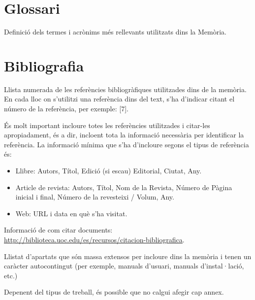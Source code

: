 \documentclass[CAT]{TFUOC}%
\begin{document}


\chapter{Glossari}

Definició dels termes i acrònims més rellevants utilitzats dins la Memòria.


\chapter{Bibliografia}

Llista numerada de les referències bibliogràfiques utilitzades dins de la memòria. En cada lloc on s'utilitzi una referència dins del text, s'ha d'indicar citant el número de la referència, per exemple: [7].

És molt important incloure totes les referències utilitzades i citar-les apropiadament, és a dir, incloent tota la informació necessària per identificar la referència. La informació mínima que s'ha d'incloure segons el tipus de referència és:

\begin{itemize}
\item Llibre: Autors, Títol, Edició (si escau) Editorial, Ciutat, Any.
\item  Article de revista: Autors, Títol, Nom de la Revista, Número de Pàgina inicial i final, Número de la revesteixi / Volum, Any.
\item  Web: URL i data en què s'ha visitat.
\end{itemize}

Informació de com citar documents: \url{http://biblioteca.uoc.edu/es/recursos/citacion-bibliografica}.


\newpage
\appendix
Llistat d’apartats que són massa extensos per incloure dins la memòria i tenen un caràcter autocontingut (per exemple, manuals d’usuari, manuals d’instal·lació, etc.)
 
Depenent del tipus de treball, és possible que no calgui afegir cap annex.
\end{document}
